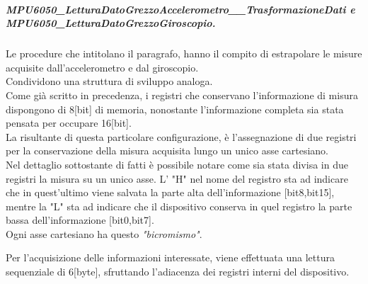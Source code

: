 \documentclass[11pt]{report}
\begin{document}
\subparagraph{MPU6050\_LetturaDatoGrezzoAccelerometro\_\_TrasformazioneDati e\\ MPU6050\_LetturaDatoGrezzoGiroscopio.}
Le procedure che intitolano il paragrafo, hanno il compito di estrapolare le misure acquisite dall'accelerometro e dal giroscopio.\\Condividono una struttura di sviluppo analoga.\\
Come già scritto in precedenza, i registri che conservano l'informazione di misura dispongono di 8[bit] di memoria, nonostante l'informazione completa sia stata pensata per occupare 16[bit].\\
La risultante di questa particolare configurazione, è l'assegnazione di due registri per la conservazione della misura acquisita lungo un unico asse cartesiano.\\
Nel dettaglio sottostante di fatti è possibile notare come sia stata divisa in due registri la misura su un unico asse.
L' "H" nel nome del registro sta ad indicare che in quest'ultimo viene salvata la parte alta dell'informazione [bit8,bit15], mentre la "L" sta ad indicare che il dispositivo conserva in quel registro la parte bassa dell'informazione [bit0,bit7].\\
Ogni asse cartesiano ha questo \textit{"bicromismo"}.
\begin{table}[H]
    \centering
    \caption{Dettaglio sull'adiacenza dei registri contenenti l'informazione}
    \label{tab: tabella}
\end{table}
Per l'acquisizione delle informazioni interessate, viene effettuata una lettura sequenziale di 6[byte], sfruttando l'adiacenza dei registri interni del dispositivo.
\end{document}
